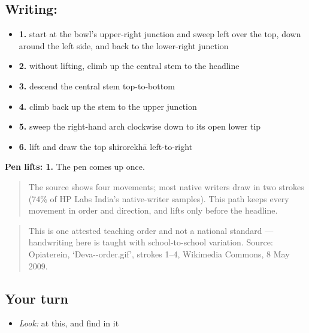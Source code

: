 \subsection*{Writing: }

\begin{itemize}
\raggedright
  \item \textbf{1.} start at the bowl's upper-right junction and sweep left over the top, down around the left side, and back to the lower-right junction
  \item \textbf{2.} without lifting, climb up the central stem to the headline
  \item \textbf{3.} descend the central stem top-to-bottom
  \item \textbf{4.} climb back up the stem to the upper junction
  \item \textbf{5.} sweep the right-hand arch clockwise down to its open lower tip
  \item \textbf{6.} lift and draw the top shirorekhā left-to-right
\end{itemize}

\textbf{Pen lifts: 1.} The pen comes up once.

\begin{quote}
The source shows four movements; most native writers draw  in two strokes (74\% of HP Labs India's native-writer samples). This path keeps every movement in order and direction, and lifts only before the headline.
\end{quote}

\begin{quote}
This is one attested teaching order and not a national standard — handwriting here is taught with school-to-school variation. Source: Opiaterein, ‘Deva--order.gif’, strokes 1–4, Wikimedia Commons, 8 May 2009.
\end{quote}

\subsection*{Your turn}
\begin{itemize}
\raggedright
  \item \emph{Look:} at this, and find  in it
\end{itemize}

\begin{quote}
\end{quote}

